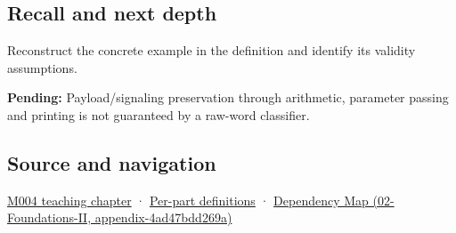 \subsection{Recall and next depth}\label{recall-and-next-depth}

Reconstruct the concrete example in the definition and identify its validity assumptions.

\textbf{Pending:} Payload/signaling preservation through arithmetic, parameter passing and printing is not guaranteed by a raw-word classifier.

\subsection{Source and navigation}\label{source-and-navigation}

\href{Continuous\%20Notes/Computing\%20Foundations\%20-\%20From\%20Bits\%20to\%20C++\%20and\%20Systems\%20APIs\#A\%20stretching\%20ruler\%20for\%20real-valued\%20quantities}{M004 teaching chapter} · \hyperref[appendix-fd090d982a15]{Per-part definitions} · \href{}{Dependency Map (02-Foundations-II, appendix-4ad47bdd269a)}
